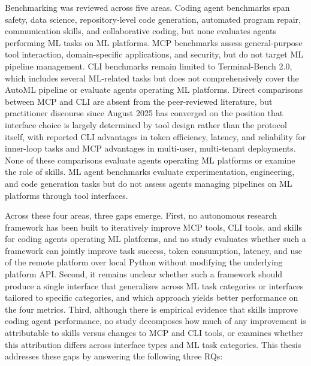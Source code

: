 \documentclass[
english,                 %
bibtex,                  %
includeExtraAbstracts, %
]{kththesis}
\numberwithin{listing}{chapter}
\begin{document}
Benchmarking was reviewed across five areas. Coding agent benchmarks span safety, data science, repository-level code generation, automated program repair, communication skills, and collaborative coding, but none evaluates agents performing \gls{ML} tasks on \gls{ML} platforms. \Gls{MCP} benchmarks assess general-purpose tool interaction, domain-specific applications, and security, but do not target \gls{ML} pipeline management. \Gls{CLI} benchmarks remain limited to Terminal-Bench 2.0, which includes several \gls{ML}-related tasks but does not comprehensively cover the \gls{AutoML} pipeline or evaluate agents operating \gls{ML} platforms. Direct comparisons between \gls{MCP} and \gls{CLI} are absent from the peer-reviewed literature, but practitioner discourse since August 2025 has converged on the position that interface choice is largely determined by tool design rather than the protocol itself, with reported \gls{CLI} advantages in token efficiency, latency, and reliability for inner-loop tasks and \gls{MCP} advantages in multi-user, multi-tenant deployments. None of these comparisons evaluate agents operating \gls{ML} platforms or examine the role of skills. \Gls{ML} agent benchmarks evaluate experimentation, engineering, and code generation tasks but do not assess agents managing pipelines on \gls{ML} platforms through tool interfaces.

Across these four areas, three gaps emerge. First, no autonomous research framework has been built to iteratively improve \gls{MCP} tools, \gls{CLI} tools, and skills for coding agents operating \gls{ML} platforms, and no study evaluates whether such a framework can jointly improve task success, token consumption, latency, and use of the remote platform over local Python without modifying the underlying platform \gls{API}. Second, it remains unclear whether such a framework should produce a single interface that generalizes across \gls{ML} task categories or interfaces tailored to specific categories, and which approach yields better performance on the four metrics. Third, although there is empirical evidence that skills improve coding agent performance, no study decomposes how much of any improvement is attributable to skills versus changes to \gls{MCP} and \gls{CLI} tools, or examines whether this attribution differs across interface types and \gls{ML} task categories. This thesis addresses these gaps by answering the following three \glspl{RQ}:
\end{document}

